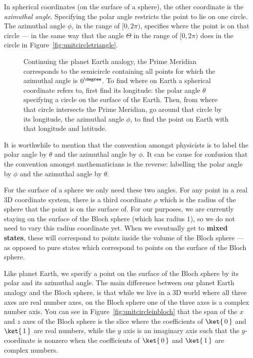 \documentclass{article}
\def\tikzscale{1.5}
\theoremstyle{definition}
\newcommand{\kz}[1]{\ket{\,#1\,}}
\begin{document}
In spherical coordinates (on the surface of a sphere), the other coordinate is the \textit{azimuthal angle}.  Specifying the polar angle restricts the point to lie on one circle.  The azimuthal angle $\phi$, in the range of $[0,2\pi)$, specifies where the point is on that circle --- in the same way that the angle $\Theta$ in the range of $[0,2\pi)$ does in the circle in Figure~\ref{fig:unitcircletriangle}.
\begin{figure}[H]
	\centering
	\scalebox{\tikzscale}{\tikzfig{latitude}}
	\caption{Continuing the planet Earth analogy, the Prime Meridian corresponds to the semicircle containing all points for which the azimuthal angle is $0^{\degree}$.  To find where on Earth a spherical coordinate refers to, first find its longitude: the polar angle $\theta$ specifying a circle on the surface of the Earth.  Then, from where that circle intersects the Prime Meridian, go around that circle by its longitude, the azimuthal angle $\phi$, to find the point on Earth with that longitude and latitude.}
\end{figure}
It is worthwhile to mention that the convention amongst physicists is to label the polar angle by $\theta$ and the azimuthal angle by $\phi$.  It can be cause for confusion that the convention amongst mathematicians is the reverse: labelling the polar angle by $\phi$ and the azimuthal angle by $\theta$.

For the surface of a sphere we only need these two angles.  For any point in a real 3D coordinate system, there is a third coordinate $\rho$ which is the radius of the sphere that the point is on the surface of.  For our purposes, we are currently staying on the surface of the Bloch sphere (which has radius $1$), so we do not need to vary this radius coordinate yet.  When we eventually get to \textbf{mixed states}, these will correspond to points inside the volume of the Bloch sphere --- as opposed to pure states which correspond to points on the surface of the Bloch sphere.

Like planet Earth, we specify a point on the surface of the Bloch sphere by its polar and its azimuthal angle.  The main difference between our planet Earth analogy and the Bloch sphere, is that while we live in a 3D world where all three axes are real number axes, on the Bloch sphere one of the three axes is a complex number axis.  You can see in Figure~\ref{fig:unitcircleinbloch} that the span of the $x$ and $z$ axes of the Bloch sphere is the slice where the coefficients of $\kz0$ and $\kz1$ are real numbers, while the $y$ axis is an imaginary axis such that the $y$-coordinate is nonzero when the coefficients of $\kz0$ and $\kz1$ are complex numbers.
\end{document}
